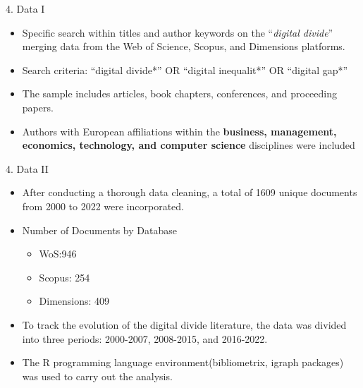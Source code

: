 \documentclass[
  ignorenonframetext,
]{beamer}
\providecommand{\tightlist}{%
  \setlength{\itemsep}{0pt}\setlength{\parskip}{0pt}}
\begin{document}
\begin{frame}{4. Data I}
\protect\hypertarget{data-i}{}
\begin{itemize}
\tightlist
\item
  Specific search within titles and author keywords on the
  ``\emph{digital divide}'' merging data from the Web of Science,
  Scopus, and Dimensions platforms.
\item
  Search criteria: ``digital divide*'' OR ``digital inequalit*'' OR
  ``digital gap*''
\item
  The sample includes articles, book chapters, conferences, and
  proceeding papers.
\item
  Authors with European affiliations within the \textbf{business,
  management, economics, technology, and computer science} disciplines
  were included
\end{itemize}
\end{frame}

\begin{frame}{4. Data II}
\protect\hypertarget{data-ii}{}
\begin{itemize}
\item
  After conducting a thorough data cleaning, a total of 1609 unique
  documents from 2000 to 2022 were incorporated.
\item
  Number of Documents by Database

  \begin{itemize}
  \tightlist
  \item
    WoS:946
  \item
    Scopus: 254
  \item
    Dimensions: 409
  \end{itemize}
\item
  To track the evolution of the digital divide literature, the data was
  divided into three periods: 2000-2007, 2008-2015, and 2016-2022.
\item
  The R programming language environment(bibliometrix, igraph packages)
  was used to carry out the analysis.
\end{itemize}
\end{frame}
\end{document}
